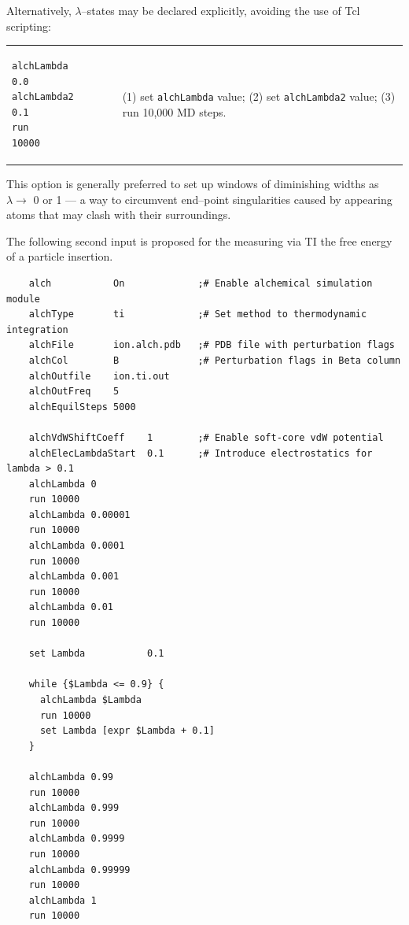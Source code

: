 Alternatively, $\lambda$--states may be declared
explicitly, avoiding the use of {\sc Tcl} scripting:

\begin{tabular}{ll}
\begin{minipage}{8cm}
\begin{verbatim}
alchLambda      0.0
alchLambda2     0.1
run             10000
\end{verbatim}
\end{minipage}
&
\begin{minipage}{7.8cm}
(1) set {\tt alchLambda} value;
\newline
(2) set {\tt alchLambda2} value;
\newline
(3) run 10,000 MD steps.
\end{minipage}
\end{tabular}


This option is generally preferred to set up windows of diminishing
widths as $\lambda \rightarrow$ 0 or 1 --- a way to circumvent
end--point singularities caused by appearing atoms that may
clash with their surroundings.


The following second input is proposed for the measuring via TI the free energy
of a particle insertion.

\begin{verbatim}
    alch           On             ;# Enable alchemical simulation module
    alchType       ti             ;# Set method to thermodynamic integration
    alchFile       ion.alch.pdb   ;# PDB file with perturbation flags
    alchCol        B              ;# Perturbation flags in Beta column
    alchOutfile    ion.ti.out
    alchOutFreq    5
    alchEquilSteps 5000

    alchVdWShiftCoeff    1        ;# Enable soft-core vdW potential
    alchElecLambdaStart  0.1      ;# Introduce electrostatics for lambda > 0.1
    alchLambda 0
    run 10000
    alchLambda 0.00001
    run 10000
    alchLambda 0.0001
    run 10000
    alchLambda 0.001
    run 10000
    alchLambda 0.01
    run 10000

    set Lambda           0.1

    while {$Lambda <= 0.9} {
      alchLambda $Lambda
      run 10000
      set Lambda [expr $Lambda + 0.1]
    }

    alchLambda 0.99
    run 10000
    alchLambda 0.999
    run 10000
    alchLambda 0.9999
    run 10000
    alchLambda 0.99999
    run 10000
    alchLambda 1
    run 10000

\end{verbatim}


